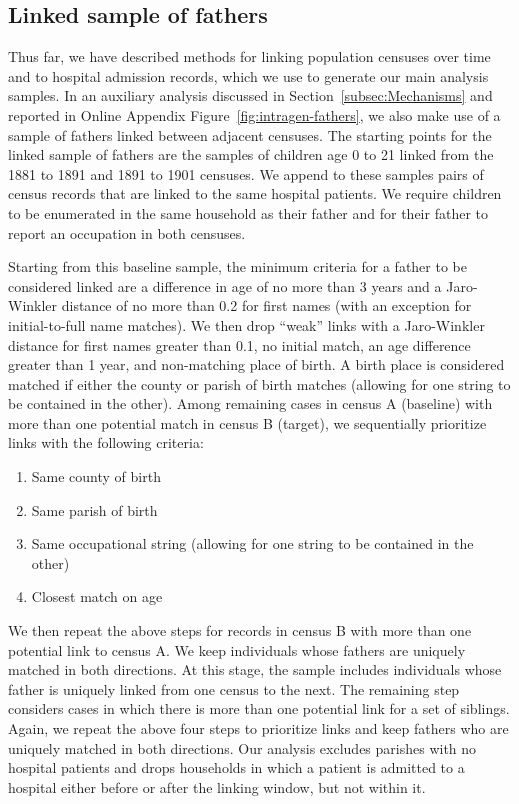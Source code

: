 \documentclass[12pt,english]{article}
\begin{document}
\subsection[Linked sample of fathers]{Linked sample of fathers\label{sec:linking-fathers}}

Thus far, we have described methods for linking population censuses over time and to hospital admission records, which we use to generate our main analysis samples. In an auxiliary analysis discussed in Section~\ref{subsec:Mechanisms} and reported in Online Appendix Figure~\ref{fig:intragen-fathers}, we also make use of a sample of fathers linked between adjacent censuses. The starting points for the linked sample of fathers are the samples of children age 0 to 21 linked from the 1881 to 1891 and 1891 to 1901 censuses. We append to these samples pairs of census records that are linked to the same hospital patients. We require children to be enumerated in the same household as their father and for their father to report an occupation in both censuses.

Starting from this baseline sample, the minimum criteria for a father to be considered linked are a difference in age of no more than 3 years and a Jaro-Winkler distance of no more than 0.2 for first names (with an exception for initial-to-full name matches). We then drop ``weak'' links with a Jaro-Winkler distance for first names greater than 0.1, no initial match, an age difference greater than 1 year, and non-matching place of birth. A birth place is considered matched if either the county or parish of birth matches (allowing for one string to be contained in the other). Among remaining cases in census A (baseline) with more than one potential match in census B (target), we sequentially prioritize links with the following criteria:
\begin{enumerate}
    \item Same county of birth
    \item Same parish of birth
    \item Same occupational string (allowing for one string to be contained in the other)
    \item Closest match on age
\end{enumerate}
\noindent We then repeat the above steps for records in census B with more than one potential link to census A. We keep individuals whose fathers are uniquely matched in both directions. At this stage, the sample includes individuals whose father is uniquely linked from one census to the next. The remaining step considers cases in which there is more than one potential link for a set of siblings. Again, we repeat the above four steps to prioritize links and keep fathers who are uniquely matched in both directions. Our analysis excludes parishes with no hospital patients and drops households in which a patient is admitted to a hospital either before or after the linking window, but not within it.
\end{document}
